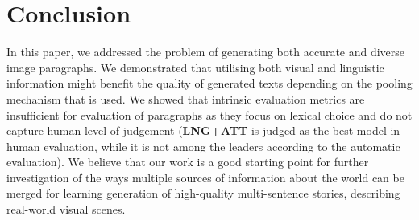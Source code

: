\documentclass[11pt,a4paper]{article}
\begin{document}
\section{Conclusion}


In this paper, we addressed the problem of generating both accurate and diverse image paragraphs.
We demonstrated that utilising both visual and linguistic information might benefit the quality of generated texts depending on the pooling mechanism that is used.
We showed that intrinsic evaluation metrics are insufficient for evaluation of paragraphs as they focus on lexical choice and do not capture human level of judgement (\textbf{LNG+ATT} is judged as the best model in human evaluation, while it is not among the leaders according to the automatic evaluation).
We believe that our work is a good starting point for further investigation of the ways multiple sources of information about the world can be merged for learning generation of high-quality multi-sentence stories, describing real-world visual scenes.





\end{document}
